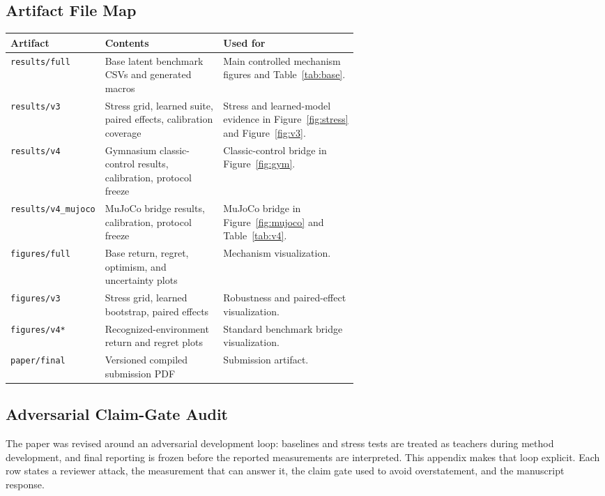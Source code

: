 \documentclass{article}
\begin{document}
\subsection{Artifact File Map}

\begin{center}
\small
\begin{tabularx}{\linewidth}{p{0.24\linewidth}p{0.34\linewidth}X}
\toprule
Artifact & Contents & Used for \\
\midrule
\texttt{results/full} &
Base latent benchmark CSVs and generated macros &
Main controlled mechanism figures and Table~\ref{tab:base}. \\
\texttt{results/v3} &
Stress grid, learned suite, paired effects, calibration coverage &
Stress and learned-model evidence in Figure~\ref{fig:stress} and
Figure~\ref{fig:v3}. \\
\texttt{results/v4} &
Gymnasium classic-control results, calibration, protocol freeze &
Classic-control bridge in Figure~\ref{fig:gym}. \\
\texttt{results/v4\_mujoco} &
MuJoCo bridge results, calibration, protocol freeze &
MuJoCo bridge in Figure~\ref{fig:mujoco} and Table~\ref{tab:v4}. \\
\texttt{figures/full} &
Base return, regret, optimism, and uncertainty plots &
Mechanism visualization. \\
\texttt{figures/v3} &
Stress grid, learned bootstrap, paired effects &
Robustness and paired-effect visualization. \\
\texttt{figures/v4*} &
Recognized-environment return and regret plots &
Standard benchmark bridge visualization. \\
\texttt{paper/final} &
Versioned compiled submission PDF &
Submission artifact. \\
\bottomrule
\end{tabularx}
\end{center}

\subsection{Adversarial Claim-Gate Audit}

The paper was revised around an adversarial development loop: baselines and
stress tests are treated as teachers during method development, and final
reporting is frozen before the reported measurements are interpreted. This
appendix makes that loop explicit. Each row states a reviewer attack, the
measurement that can answer it, the claim gate used to avoid overstatement,
and the manuscript response.
\end{document}
